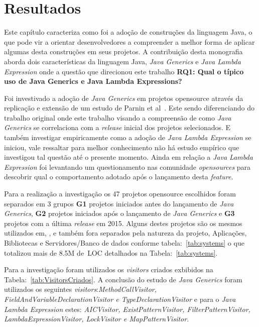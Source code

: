 \chapter{Resultados}
Este capítulo caracteriza como foi a adoção de construções da linguagem Java, o que pode vir a orientar desenvolvedores a compreender a melhor forma de aplicar algumas desta construções em seus projetos.
A contribuição desta monografia aborda dois características da linguagem Java, \textit{Java Generics} e \textit{Java Lambda Expression} onde a questão que direcionou este trabalho \textbf{RQ1: Qual o típico uso de Java Generics e Java Lambda Expressions?}

Foi investivado a adoção de \textit{Java Generics} em projetos opensource através da replicação e extensão de um estudo de Parnin et al~\cite{Parnin:ACM2011}. Este sendo diferenciando do trabalho original onde este trabalho visando a compreensão de como \textit{Java Generics} se correlaciona com a \textit{release} inicial dos projetos selecionados. 
E também investigar empiricamente como a adoção de \textit{Java Lambda Expression} se iniciou, vale ressaltar para melhor conhecimento não há estudo empírico que investigou tal questão até o presente momento.
Ainda em relação a \textit{Java Lambda Expression} foi levantando um questionamento nas comunidade \textit{opensources} para descobrir qual o comportamento  adotado após o lançamento desta \textit{feature}. 

Para a realização a investigação os 47 projetos opensource escolhidos foram separados em 3 grupos \textbf{G1} projetos iniciados antes do lançamento de \textit{Java Generics}, \textbf{G2} projetos iniciados após o lançamento de \textit{Java Generics} e \textbf{G3} projetos com a última \textit{release} em 2015. Alguns destes projetos são os mesmos utilizados em, \cite{Parnin:ACM2011, Dyer:ACM2014, ward2015performance}, e também fora separados pela natureza da projeto,  Aplicações, Bibliotecas e Servidores/Banco de dados conforme tabela:~\ref{tab:systems} o que totalizou mais de 8.5M de~\acs{LOC} detalhados na Tabela:~\ref*{tab:systems}.

Para a investigação foram utilizados os \textit{visitors} criados exbibidos na  Tabela:~\ref{tab:VisitorsCriados}. A conclusão do estudo de \textit{Java Generics} foram utilizados os seguintes \textit{visitors}:\textit{MethodCallVisitor, FieldAndVariableDeclarationVisitor e TypeDeclarationVisitor} e para o \textit{Java Lambda Expression} estes: \textit{AICVisitor, ExistPatternVisitor, FilterPatternVisitor, LambdaExpressionVisitor, LockVisitor e MapPatternVisitor}.



